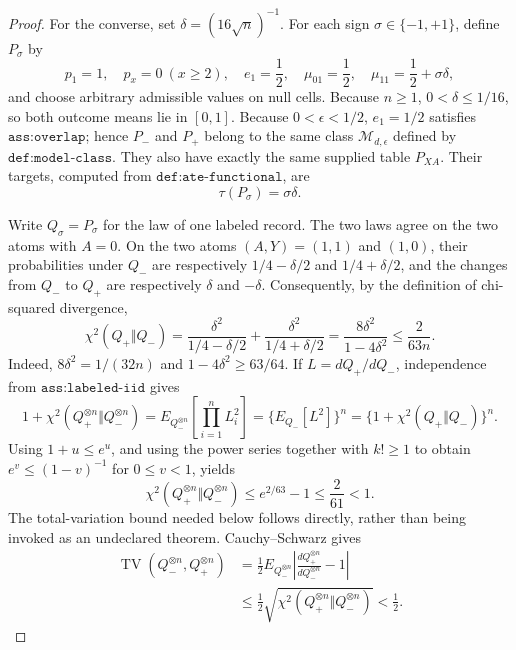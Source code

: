 \documentclass{article}
\begin{document}
\begin{proof}
For the converse, set \(\delta=(16\sqrt n)^{-1}\).  For each sign \(\sigma\in\{-1,+1\}\), define \(P_\sigma\) by
\[
p_1=1,\quad p_x=0\ (x\geq2),\quad e_1=\frac12,
\quad \mu_{01}=\frac12,
\quad \mu_{11}=\frac12+\sigma\delta,
\]
and choose arbitrary admissible values on null cells.  Because \(n\geq1\), \(0<\delta\leq1/16\), so both outcome means lie in \([0,1]\).  Because \(0<\epsilon<1/2\), \(e_1=1/2\) satisfies \(\texttt{ass:overlap}\); hence \(P_-\) and \(P_+\) belong to the same class \(\mathcal M_{d,\epsilon}\) defined by \(\texttt{def:model-class}\).  They also have exactly the same supplied table \(P_{XA}\).  Their targets, computed from \(\texttt{def:ate-functional}\), are
\[
\tau(P_\sigma)=\sigma\delta.
\]

Write \(Q_\sigma=P_\sigma\) for the law of one labeled record.  The two laws agree on the two atoms with \(A=0\).  On the two atoms \((A,Y)=(1,1)\) and \((1,0)\), their probabilities under \(Q_-\) are respectively \(1/4-\delta/2\) and \(1/4+\delta/2\), and the changes from \(Q_-\) to \(Q_+\) are respectively \(\delta\) and \(-\delta\).  Consequently, by the definition of chi-squared divergence,
\[
\chi^2(Q_+\Vert Q_-)
=\frac{\delta^2}{1/4-\delta/2}
 +\frac{\delta^2}{1/4+\delta/2}
=\frac{8\delta^2}{1-4\delta^2}
\leq\frac{2}{63n}.
\]
Indeed, \(8\delta^2=1/(32n)\) and \(1-4\delta^2\geq63/64\).  If \(L=dQ_+/dQ_-\), independence from \(\texttt{ass:labeled-iid}\) gives
\[
1+\chi^2(Q_+^{\otimes n}\Vert Q_-^{\otimes n})
=E_{Q_-^{\otimes n}}\!\left[\prod_{i=1}^{n}L_i^2\right]
=\{E_{Q_-}[L^2]\}^{n}
=\{1+\chi^2(Q_+\Vert Q_-)\}^{n}.
\]
Using \(1+u\leq e^u\), and using the power series together with \(k!\geq1\) to obtain \(e^v\leq(1-v)^{-1}\) for \(0\leq v<1\), yields
\[
\chi^2(Q_+^{\otimes n}\Vert Q_-^{\otimes n})
\leq e^{2/63}-1
\leq\frac{2}{61}<1.
\]
The total-variation bound needed below follows directly, rather than being invoked as an undeclared theorem.  Cauchy--Schwarz gives
\[
\begin{aligned}
\operatorname{TV}(Q_-^{\otimes n},Q_+^{\otimes n})
&=\frac12E_{Q_-^{\otimes n}}\left|
\frac{dQ_+^{\otimes n}}{dQ_-^{\otimes n}}-1
\right|\\
&\leq\frac12
\sqrt{\chi^2(Q_+^{\otimes n}\Vert Q_-^{\otimes n})}
<\frac12.
\end{aligned}
\]


\end{proof}
\end{document}
